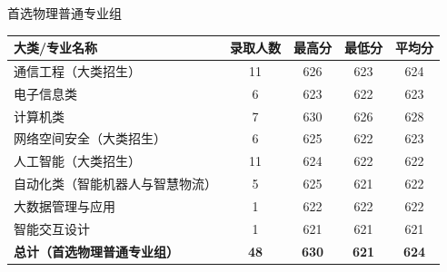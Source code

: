 \documentclass[aspectratio=169, utf8, fontset=windows]{beamer}
\begin{document}
\begin{frame}{首选物理普通专业组}
    \begin{table}
        \small
        \centering
        \begin{tabular}{lcccc}
            \toprule
            \textcolor{Fore}{\textbf{大类/专业名称}}       & \textcolor{Fore}{\textbf{录取人数}} & \textcolor{Fore}{\textbf{最高分}} & \textcolor{Fore}{\textbf{最低分}} & \textcolor{Fore}{\textbf{平均分}} \\ \midrule
            通信工程（大类招生）                               & 11                              & 626                            & 623                            & 624                            \\
            电子信息类                                    & 6                               & 623                            & 622                            & 623                            \\
            计算机类                                     & 7                               & 630                            & 626                            & 628                            \\
            网络空间安全（大类招生）                             & 6                               & 625                            & 622                            & 623                            \\
            人工智能（大类招生）                               & 11                              & 624                            & 622                            & 622                            \\
            自动化类（智能机器人与智慧物流）                         & 5                               & 625                            & 621                            & 622                            \\
            大数据管理与应用                                 & 1                               & 622                            & 622                            & 622                            \\
            智能交互设计                                   & 1                               & 621                            & 621                            & 621                            \\
            \textcolor{Fore}{\textbf{总计（首选物理普通专业组）}} & \textcolor{Fore}{\textbf{48}}   & \textcolor{Fore}{\textbf{630}} & \textcolor{Fore}{\textbf{621}} & \textcolor{Fore}{\textbf{624}} \\ \midrule
        \end{tabular}
    \end{table}
\end{frame}
\end{document}
